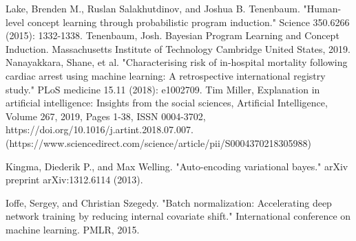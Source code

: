 \documentclass{JMLFS}
\begin{document}
\begin{thebibliography}{99}
 Lake, Brenden M., Ruslan Salakhutdinov, and Joshua B. Tenenbaum. "Human-level concept learning through probabilistic program induction." Science 350.6266 (2015): 1332-1338.
Tenenbaum, Josh. Bayesian Program Learning and Concept Induction. Massachusetts Institute of Technology Cambridge United States, 2019.
 Nanayakkara, Shane, et al. "Characterising risk of in-hospital mortality following cardiac arrest using machine learning: A retrospective international registry study." PLoS medicine 15.11 (2018): e1002709.
 Tim Miller, Explanation in artificial intelligence: Insights from the social sciences, Artificial Intelligence, Volume 267,
2019, Pages 1-38,  ISSN 0004-3702, https://doi.org/10.1016/j.artint.2018.07.007. (https://www.sciencedirect.com/science/article/pii/S0004370218305988)

 Kingma, Diederik P., and Max Welling. "Auto-encoding variational bayes." arXiv preprint arXiv:1312.6114 (2013).

 Ioffe, Sergey, and Christian Szegedy. "Batch normalization: Accelerating deep network training by reducing internal covariate shift." International conference on machine learning. PMLR, 2015.

\end{thebibliography}
\end{document}
